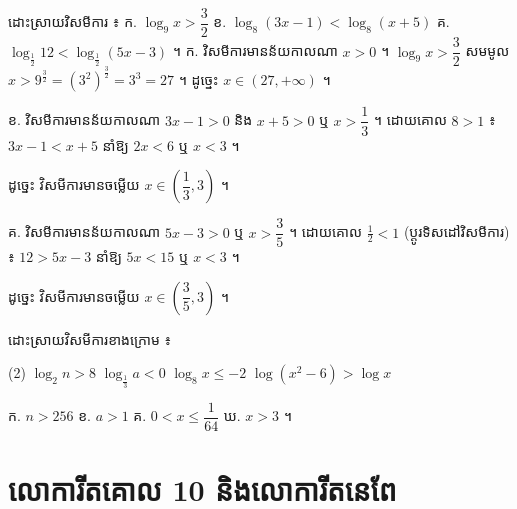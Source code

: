 \begin{example}[លំហាត់គំរូ]
ដោះស្រាយវិសមីការ ៖ \quad ក. $\log_9 x > \dfrac{3}{2}$ \quad ខ. $\log_8(3x - 1) < \log_8(x + 5)$ \quad គ. $\log_{\frac{1}{2}} 12 < \log_{\frac{1}{2}}(5x - 3)$ ។
\ans
ក. វិសមីការមានន័យកាលណា $x > 0$ ។ $\log_9 x > \dfrac{3}{2}$ សមមូល $x > 9^{\frac{3}{2}} = (3^2)^{\frac{3}{2}} = 3^3 = 27$ ។ ដូច្នេះ $x \in (27, +\infty)$ ។

ខ. វិសមីការមានន័យកាលណា $3x - 1 > 0$ និង $x + 5 > 0$ ឬ $x > \dfrac{1}{3}$ ។ ដោយគោល $8 > 1$ ៖ $3x - 1 < x + 5$ នាំឱ្យ $2x < 6$ ឬ $x < 3$ ។
\begin{center}
\end{center}
ដូច្នេះ វិសមីការមានចម្លើយ $x \in \left(\dfrac{1}{3}, 3\right)$ ។

គ. វិសមីការមានន័យកាលណា $5x - 3 > 0$ ឬ $x > \dfrac{3}{5}$ ។ ដោយគោល $\frac{1}{2} < 1$ (ប្ដូរទិសដៅវិសមីការ) ៖ $12 > 5x - 3$ នាំឱ្យ $5x < 15$ ឬ $x < 3$ ។
\begin{center}
\end{center}
ដូច្នេះ វិសមីការមានចម្លើយ $x \in \left(\dfrac{3}{5}, 3\right)$ ។
\end{example}

\begin{pro}
ដោះស្រាយវិសមីការខាងក្រោម ៖
\begin{tasks}(2)
  \task $\log_2 n > 8$
  \task $\log_{\frac{1}{3}} a < 0$
  \task $\log_8 x \le -2$
  \task $\log(x^2 - 6) > \log x$
\end{tasks}
\ans
ក. $n > 256$ \quad ខ. $a > 1$ \quad គ. $0 < x \le \dfrac{1}{64}$ \quad ឃ. $x > 3$ ។
\end{pro}

\section{លោការីតគោល 10 និងលោការីតនេពែ}
